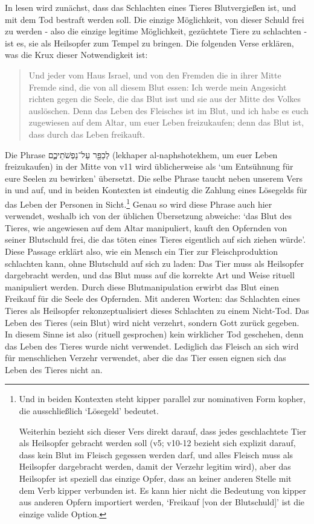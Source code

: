 In  lesen wird zunächst, dass das Schlachten eines Tieres Blutvergießen ist, und mit dem Tod bestraft werden soll.
Die einzige Möglichkeit, von dieser Schuld frei zu werden - also die einzige legitime Möglichkeit, gezüchtete Tiere zu schlachten - ist es, sie als Heilsopfer zum Tempel zu bringen.
Die folgenden Verse erklären, was die Krux dieser Notwendigkeit ist:
\begin{quote}
	Und jeder vom Haus Israel, und von den Fremden die in ihrer Mitte Fremde sind, die von all diesem Blut essen:
	Ich werde mein Angesicht richten gegen die Seele, die das Blut isst und sie aus der Mitte des Volkes auslöschen.
	Denn das Leben des Fleisches ist im Blut, und ich habe es euch zugewiesen auf dem Altar, um euer Leben freizukaufen; denn das Blut ist, dass durch das Leben freikauft.
\end{quote}
Die Phrase לְכַפֵּ֖ר עַל־נַפְשֹׁתֵיכֶ֑ם (lekhaper al-naphshotekhem, um euer Leben freizukaufen) in der Mitte von v11 wird üblicherweise als `um Entsühnung für eure Seelen zu bewirken' übersetzt.
Die selbe Phrase taucht neben unserem Vers in  und  auf,
und in beiden Kontexten ist eindeutig die Zahlung
eines Lösegelds für das Leben der Personen in Sicht.\footnote{
Und in beiden Kontexten steht kipper parallel zur nominativen Form kopher, die ausschließlich `Lösegeld' bedeutet.

Weiterhin bezieht sich dieser Vers direkt darauf, dass jedes geschlachtete Tier als Heilsopfer gebracht werden soll (v5; v10-12 bezieht sich explizit darauf, dass kein Blut im Fleisch gegessen werden darf, und alles Fleisch muss als Heilsopfer dargebracht werden, damit der Verzehr legitim wird),
aber das Heilsopfer ist speziell das einzige Opfer, dass an keiner anderen Stelle mit dem Verb kipper verbunden ist.
Es kann hier nicht die Bedeutung von kipper aus anderen Opfern importiert werden, `Freikauf [von der Blutschuld]' ist die einzige valide Option.
}
Genau so wird diese Phrase auch hier verwendet, weshalb ich von der üblichen Übersetzung abweiche:
`das Blut des Tieres, wie angewiesen auf dem Altar manipuliert, kauft den Opfernden von seiner Blutschuld frei, die das töten eines Tieres eigentlich auf sich ziehen würde'.
Diese Passage erklärt also, wie ein Mensch ein Tier zur Fleischproduktion schlachten kann, ohne Blutschuld auf sich zu laden:
Das Tier muss als Heilsopfer dargebracht werden, und das Blut muss auf die korrekte Art und Weise rituell manipuliert werden.
Durch diese Blutmanipulation erwirbt das Blut einen Freikauf für die Seele des Opfernden.
Mit anderen Worten: das Schlachten eines Tieres als Heilsopfer rekonzeptualisiert dieses Schlachten zu einem Nicht-Tod.
Das Leben des Tieres (sein Blut) wird nicht verzehrt, sondern Gott zurück gegeben. In diesem Sinne ist also (rituell gesprochen) kein wirklicher Tod geschehen,
denn das Leben des Tieres wurde nicht verwendet.
Lediglich das Fleisch an sich wird für menschlichen Verzehr verwendet, aber die das Tier essen eignen sich das Leben des Tieres nicht an.

